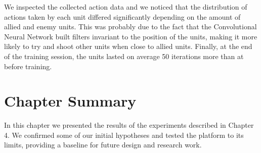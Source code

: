 We inspected the collected action data and we noticed that the distribution of
actions taken by each unit differed significantly depending on the amount of
allied and enemy units. This was probably due to the fact that the Convolutional
Neural Network built filters invariant to the position of the units, making it
more likely to try and shoot other units when close to allied units. Finally,
at the end of the training session, the units lasted on average 50 iterations
more than at before training.

\section{Chapter Summary}

In this chapter we presented the results of the experiments described in Chapter
4. We confirmed some of our initial hypotheses and tested the platform to its
limits, providing a baseline for future design and research work.

